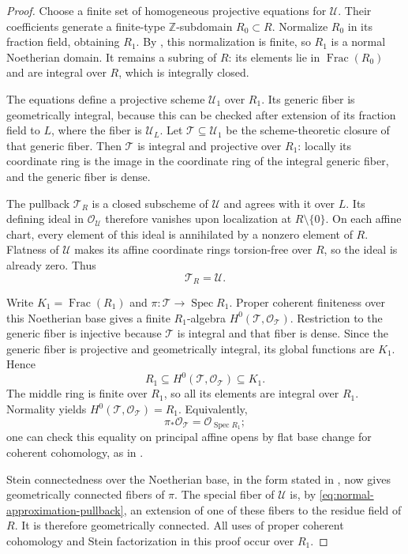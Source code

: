 \begin{proof}
Choose a finite set of homogeneous projective equations for
$\mathcal U$. Their coefficients generate a finite-type
$\mathbb Z$-subdomain $R_0\subset R$. Normalize $R_0$ in its fraction
field, obtaining $R_1$. By , this
normalization is finite, so $R_1$ is a normal Noetherian domain.
It remains a subring of $R$: its elements lie in $\operatorname{Frac}(R_0)$
and are integral over $R$, which is integrally closed.

The equations define a projective scheme $\mathcal U_1$ over $R_1$.
Its generic fiber is geometrically integral, because this can be
checked after extension of its fraction field to $L$, where the
fiber is $\mathcal U_L$. Let $\mathcal T\subseteq\mathcal U_1$ be the
scheme-theoretic closure of that generic fiber. Then $\mathcal T$ is
integral and projective over $R_1$: locally its coordinate ring is
the image in the coordinate ring of the integral generic fiber,
and the generic fiber is dense.

The pullback $\mathcal T_R$ is a closed subscheme of $\mathcal U$ and
agrees with it over $L$. Its defining ideal in
$\mathcal O_{\mathcal U}$ therefore vanishes upon localization at
$R\setminus\{0\}$. On each affine chart, every element of this ideal
is annihilated by a nonzero element of $R$. Flatness of $\mathcal U$
makes its affine coordinate rings torsion-free over $R$, so the ideal
is already zero. Thus
\begin{equation}\label{eq:normal-approximation-pullback}
 \mathcal T_R=\mathcal U.
\end{equation}

Write $K_1=\operatorname{Frac}(R_1)$ and
$\pi:\mathcal T\to\operatorname{Spec}R_1$.
Proper coherent finiteness over this Noetherian base gives a finite
$R_1$-algebra $H^0(\mathcal T,\mathcal O_{\mathcal T})$.
Restriction to the generic fiber is injective because $\mathcal T$
is integral and that fiber is dense. Since the generic fiber is
projective and geometrically integral, its global functions are
$K_1$. Hence
\[
 R_1\subseteq H^0(\mathcal T,\mathcal O_{\mathcal T})\subseteq K_1.
\]
The middle ring is finite over $R_1$, so all its elements are integral
over $R_1$. Normality yields
$H^0(\mathcal T,\mathcal O_{\mathcal T})=R_1$. Equivalently,
\[
 \pi_*\mathcal O_{\mathcal T}=\mathcal O_{\operatorname{Spec}R_1};
\]
one can check this equality on principal affine opens by flat base
change for coherent cohomology, as in .

Stein connectedness over the Noetherian base, in the form stated in
, now gives geometrically connected
fibers of $\pi$. The special fiber of $\mathcal U$ is, by
\eqref{eq:normal-approximation-pullback}, an extension of one of these
fibers to the residue field of $R$. It is therefore geometrically
connected. All uses of proper coherent cohomology and Stein
factorization in this proof occur over $R_1$.
\end{proof}

